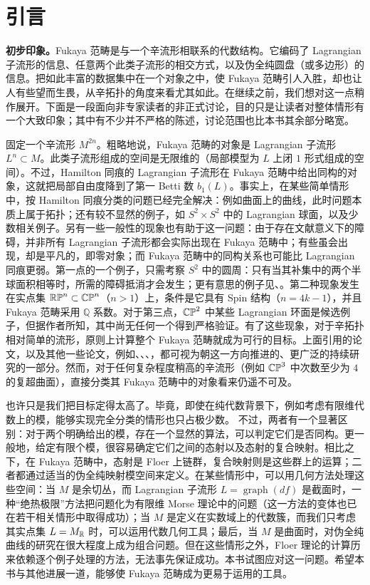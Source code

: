 \chapter*{引言}
\label{intro}
\noindent\textbf{初步印象。}Fukaya 范畴是与一个辛流形相联系的代数结构。它编码了 Lagrangian 子流形的信息、任意两个此类子流形的相交方式，以及伪全纯圆盘（或多边形）的信息。把如此丰富的数据集中在一个对象之中，使 Fukaya 范畴引人入胜，却也让人有些望而生畏，从辛拓扑的角度来看尤其如此。在继续之前，我们想对这一点稍作展开。下面是一段面向非专家读者的非正式讨论，目的只是让读者对整体情形有一个大致印象；其中有不少并不严格的陈述，讨论范围也比本书其余部分略宽。

固定一个辛流形 $M^{2n}$。粗略地说，Fukaya 范畴的对象是 Lagrangian 子流形 $L^n\subset M$。此类子流形组成的空间是无限维的（局部模型为 $L$ 上闭 $1$ 形式组成的空间）。不过，Hamilton 同痕的 Lagrangian 子流形在 Fukaya 范畴中给出同构的对象，这就把局部自由度降到了第一 Betti 数 $b_1(L)$。事实上，在某些简单情形中，按 Hamilton 同痕分类的问题已经完全解决：例如曲面上的曲线，此时问题本质上属于拓扑；还有较不显然的例子，如 $S^2\times S^2$ 中的 Lagrangian 球面，以及少数相关例子。另有一些一般性的现象也有助于这一问题：由于存在文献意义下的障碍，并非所有 Lagrangian 子流形都会实际出现在 Fukaya 范畴中；有些虽会出现，却是平凡的，即零对象；而 Fukaya 范畴中的同构关系也可能比 Lagrangian 同痕更弱。第一点的一个例子，只需考察 $S^2$ 中的圆周：只有当其补集中的两个半球面积相等时，所需的障碍抵消才会发生；更有意思的例子见、。第二种现象发生在实点集 $\mathbb{RP}^n\subset\mathbb{CP}^n$（$n>1$）上，条件是它具有 Spin 结构（$n=4k-1$），并且 Fukaya 范畴采用 $\mathbb Q$ 系数。对于第三点，$\mathbb{CP}^2$ 中某些 Lagrangian 环面是候选例子，但据作者所知，其中尚无任何一个得到严格验证。有了这些现象，对于辛拓扑相对简单的流形，原则上计算整个 Fukaya 范畴就成为可行的目标。上面引用的论文，以及其他一些论文，例如、、、，都可视为朝这一方向推进的、更广泛的持续研究的一部分。然而，对于任何复杂程度稍高的辛流形（例如 $\mathbb{CP}^3$ 中次数至少为 $4$ 的复超曲面），直接分类其 Fukaya 范畴中的对象看来仍遥不可及。

也许只是我们把目标定得太高了。毕竟，即使在纯代数背景下，例如考虑有限维代数上的模，能够实现完全分类的情形也只占极少数。
不过，两者有一个显著区别：对于两个明确给出的模，存在一个显然的算法，可以判定它们是否同构。更一般地，给定有限个模，很容易确定它们之间的态射以及态射的复合映射。相比之下，在 Fukaya 范畴中，态射是 Floer 上链群，复合映射则是这些群上的运算；二者都通过适当的伪全纯映射模空间来定义。在某些情形中，可以用几何方法处理这些空间：当 $M$ 是余切丛，而 Lagrangian 子流形 $L=\operatorname{graph}(df)$ 是截面时，一种“绝热极限”方法把问题化为有限维 Morse 理论中的问题（这一方法的变体也已在若干相关情形中取得成功）；当 $M$ 是定义在实数域上的代数簇，而我们只考虑其实点集 $L=M_{\mathbb R}$ 时，可以运用代数几何工具；最后，当 $M$ 是曲面时，对伪全纯曲线的研究在很大程度上成为组合问题。但在这些情形之外，Floer 理论的计算历来依赖逐个例子处理的方法，无法事先保证成功。本书试图应对这一问题。希望本书与其他进展一道，能够使 Fukaya 范畴成为更易于运用的工具。

